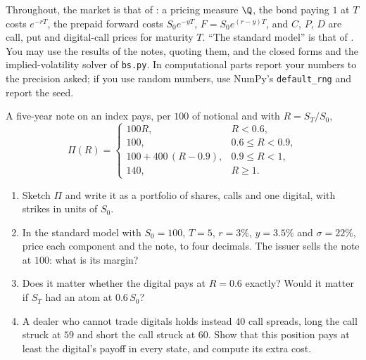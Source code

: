 Throughout, the market is that of : a pricing measure $\Q$, the bond paying $1$ at $T$
costs $e^{-rT}$, the prepaid forward costs $S_0e^{-yT}$, $F=S_0e^{(r-y)T}$, and $C$, $P$, $D$ are call, put and
digital-call prices for maturity $T$. ``The standard model'' is that of . You may use the
results of the notes, quoting them, and the closed forms and the implied-volatility solver of
\texttt{bs.py}. In computational parts report your numbers to the precision asked; if you use random
numbers, use NumPy's \texttt{default\_rng} and report the seed.

\begin{exercise}\label{ex:sr-note}
\easy A five-year note on an index pays, per $100$ of notional and with $R=S_T/S_0$,
\[
  \Pi(R)=\begin{cases}100R,&R<0.6,\\ 100,&0.6\le R<0.9,\\ 100+400\,(R-0.9),&0.9\le R<1,\\ 140,&R\ge1.\end{cases}
\]
\begin{enumerate}[label=(\alph*)]
  \item Sketch $\Pi$ and write it as a portfolio of shares, calls and one digital, with strikes in units of
    $S_0$.
  \item In the standard model with $S_0=100$, $T=5$, $r=3\%$, $y=3.5\%$ and $\sigma=22\%$, price each
    component and the note, to four decimals. The issuer sells the note at $100$: what is its margin?
  \item Does it matter whether the digital pays at $R=0.6$ exactly? Would it matter if $S_T$ had an atom at
    $0.6\,S_0$?
  \item A dealer who cannot trade digitals holds instead $40$ call spreads, long the call struck at $59$ and
    short the call struck at $60$. Show that this position pays at least the digital's payoff in every state,
    and compute its extra cost.
\end{enumerate}
\end{exercise}

